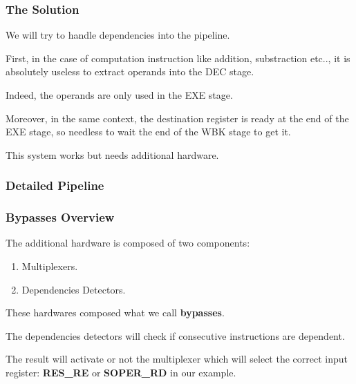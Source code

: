 \begin{frame}
  \frametitle{The Solution}

  We will try to handle dependencies into the pipeline.

  \nl

  First, in the case of computation instruction like addition, substraction
  etc.., it is absolutely useless to extract operands into the DEC stage.

  \nl

  Indeed, the operands are only used in the EXE stage.

  \nl

  Moreover, in the same context, the destination register is ready
  at the end of the EXE stage, so needless to wait the end of the
  WBK stage to get it.

  \begin{center}
  \end{center}

  This system works but needs additional hardware.
\end{frame}


\begin{frame}
  \frametitle{Detailed Pipeline}

  \begin{center}
  \end{center}
\end{frame}


\begin{frame}
  \frametitle{Bypasses Overview}

  The additional hardware is composed of two components:

  \begin{enumerate}[<+->]
    \item
      Multiplexers.
    \item
      Dependencies Detectors.
  \end{enumerate}

  \nl

  These hardwares composed what we call \textbf{bypasses}.

  \nl

  The dependencies detectors will check if consecutive instructions
  are dependent.

  \nl

  The result will activate or not the multiplexer which will select
  the correct input register: \textbf{RES\_RE} or \textbf{SOPER\_RD}
  in our example.
\end{frame}

